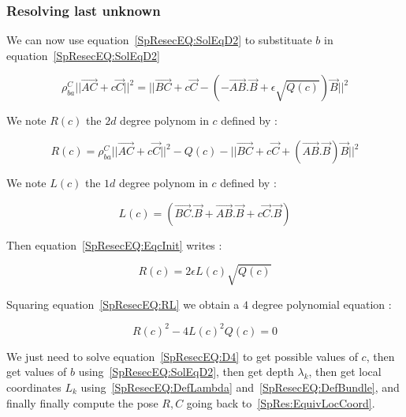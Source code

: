 \subsubsection{Resolving last unknown}

We can now use equation~\ref{SpResecEQ:SolEqD2} to substituate $b$  in equation~\ref{SpResecEQ:SolEqD2}

\begin{equation}
	\rho^C_{ba}   ||\overrightarrow{AC}  + c \Vec{C}||^2
	= || \overrightarrow{BC} + c \Vec{C} -  (-\overrightarrow{AB}. \Vec{B} + \epsilon \sqrt{Q(c)}) \Vec{B} ||^2 
	\label{SpResecEQ:EqcInit}
\end{equation}

We note $R(c)$ the $2d$ degree polynom in $c$ defined by :

\begin{equation}
   R(c) =   \rho^C_{ba}   ||\overrightarrow{AC}  + c \Vec{C}||^2
        - Q(c)
        - ||\overrightarrow{BC} + c \Vec{C} + (\overrightarrow{AB}. \Vec{B}) \Vec{B} ||^2
\end{equation}

We note $L(c)$ the $1d$ degree polynom in $c$ defined by :

\begin{equation}
	L(c)=   ( \overrightarrow{BC}.\Vec{B} + \overrightarrow{AB}. \Vec{B} +   c \Vec{C}.\Vec{B}  ) 
\end{equation}

Then equation~\ref{SpResecEQ:EqcInit} writes :

\begin{equation}
	R(c) = 2 \epsilon L(c)  \sqrt{Q(c) }   \label{SpResecEQ:RL}
\end{equation}

Squaring equation~\ref{SpResecEQ:RL} we obtain a $4$ degree polynomial equation :

\begin{equation}
	R(c) ^2 - 4 L(c)^2  Q(c) = 0   \label{SpResecEQ:D4}
\end{equation}

We just need to solve equation~\ref{SpResecEQ:D4} to get possible values of $c$, 
then get values of $b$ using~\ref{SpResecEQ:SolEqD2}, 
then get depth $\lambda _k$, then get local coordinates $L_k$ using~\ref{SpResecEQ:DefLambda} 
and~\ref{SpResecEQ:DefBundle}, and finally finally compute the pose $R,C$  going back to~\ref{SpRes:EquivLocCoord}.


